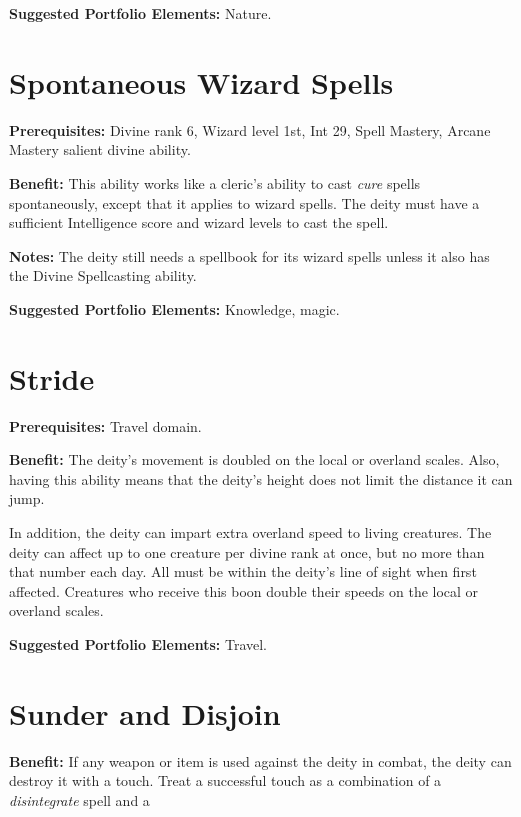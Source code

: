 \documentclass{article}
\begin{document}
\textbf{Suggested Portfolio Elements:} Nature.

\vspace{12pt}
\section*{Spontaneous Wizard Spells}

\textbf{Prerequisites:} Divine rank 6, Wizard level 1st, Int 29, Spell Mastery, 
Arcane Mastery salient divine ability.

\textbf{Benefit:} This ability works like a cleric's ability to cast \textit{cure 
}spells spontaneously, except that it applies to wizard spells. The deity must 
have a sufficient Intelligence score and wizard levels to cast the spell.

\textbf{Notes:} The deity still needs a spellbook for its wizard spells unless 
it also has the Divine Spellcasting ability.

\textbf{Suggested Portfolio Elements:} Knowledge, magic.

\vspace{12pt}
\section*{Stride}

\textbf{Prerequisites:} Travel domain.

\textbf{Benefit:} The deity's movement is doubled on the local or overland scales. 
Also, having this ability means that the deity's height does not limit the distance 
it can jump.

In addition, the deity can impart extra overland speed to living creatures. The 
deity can affect up to one creature per divine rank at once, but no more than that 
number each day. All must be within the deity's line of sight when first affected. 
Creatures who receive this boon double their speeds on the local or overland scales.

\textbf{Suggested Portfolio Elements:} Travel.

\vspace{12pt}
\section*{Sunder and Disjoin}

\textbf{Benefit:} If any weapon or item is used against the deity in combat, the 
deity can destroy it with a touch. Treat a successful touch as a combination of 
a \textit{disintegrate }spell and a 
\end{document}

